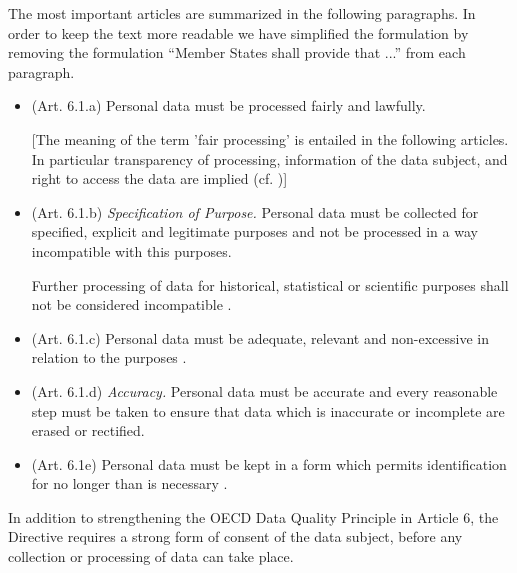 The most important articles are summarized in the following paragraphs.
In order to keep the text more readable we have simplified the formulation by removing the formulation ``Member States shall provide that ...'' from each paragraph.
\begin{itemize}
\item (Art. 6.1.a) Personal data must be processed fairly and lawfully.

[The meaning of the term 'fair processing' is entailed in the following articles.
In particular transparency of processing, information of the data subject, and right to access the data are implied (cf. \cite{EU_HANDBOOK_2014})]

\item (Art. 6.1.b) \emph{Specification of Purpose.} Personal data must be collected for specified, explicit and legitimate purposes and not be processed in a way incompatible with this purposes.

Further processing of data for historical, statistical or scientific purposes shall not be considered incompatible \om.

\item (Art. 6.1.c) Personal data must be adequate, relevant and non-excessive in relation to the purposes \om.

\item (Art. 6.1.d) \emph{Accuracy.} Personal data must be accurate and \om every reasonable step must be taken to ensure that data which is inaccurate or incomplete \om are erased or rectified.

\item (Art. 6.1e) Personal data must be kept in a form which permits identification for no longer than is necessary \om.
\end{itemize}

In addition to strengthening the OECD Data Quality Principle in Article 6, the Directive requires a strong form of consent of the data subject, before any collection or processing of data can take place.

